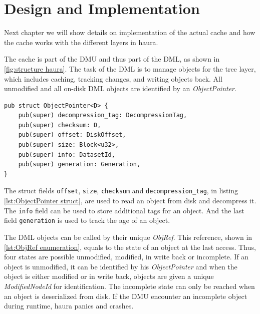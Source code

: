 \documentclass[
	12pt,
	a4paper,
	abstract,
	bibliography=totoc,
	chapterprefix,
	headings=openright,
	numbers=endperiod,
	parskip=half,
	twoside,
]{scrreprt}
\begin{document}
\chapter{Design and Implementation}
\label{cha:design and implementation}


Next chapter we will show details on implementation of the actual cache and how the cache works with the different layers in haura.

The cache is part of the DMU and thus part of the DML, as shown in \ref{fig:structure haura}.
The task of the DML is to manage objects for the tree layer, which includes caching, tracking changes, and writing objects back.
All unmodified and all on-disk DML objects are identified by an \emph{ObjectPointer}.


\begin{lstlisting}[mathescape=true,caption=ObjectPointer struct ,label=lst:ObjectPointer struct]
pub struct ObjectPointer<D> {
    pub(super) decompression_tag: DecompressionTag,
    pub(super) checksum: D,
    pub(super) offset: DiskOffset,
    pub(super) size: Block<u32>,
    pub(super) info: DatasetId,
    pub(super) generation: Generation,
}
\end{lstlisting}

The struct fields \texttt{offset}, \texttt{size}, \texttt{checksum} and \texttt{decompression\_tag}, in listing \ref{lst:ObjectPointer struct}, are used to read an object from disk and decompress it.
The \texttt{info} field can be used to store additional tags for an object.
And the last field \texttt{generation} is used to track the age of an object.

The DML objects can be called by their unique \emph{ObjRef}.
This reference, shown in \ref{lst:ObjRef enumeration}, equals to the state of an object at the last access.
Thus, four states are possible unmodified, modified, in write back or incomplete.
If an object is unmodified, it can be identified by his \emph{ObjectPointer} and
when the object is either modified or in write back, objects are given a unique \emph{ModifiedNodeId} for identification.
The incomplete state can only be reached when an object is deserialized from disk.
If the DMU encounter an incomplete object during runtime, haura panics and crashes.
\end{document}
